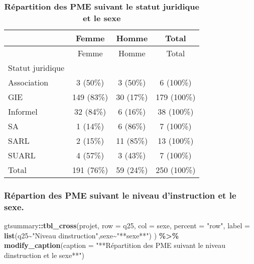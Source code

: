 \documentclass[
]{article}
\newenvironment{Shaded}{\begin{snugshade}}{\end{snugshade}}
\newcommand{\AttributeTok}[1]{\textcolor[rgb]{0.13,0.29,0.53}{#1}}
\newcommand{\FunctionTok}[1]{\textcolor[rgb]{0.13,0.29,0.53}{\textbf{#1}}}
\newcommand{\NormalTok}[1]{#1}
\newcommand{\SpecialCharTok}[1]{\textcolor[rgb]{0.81,0.36,0.00}{\textbf{#1}}}
\newcommand{\StringTok}[1]{\textcolor[rgb]{0.31,0.60,0.02}{#1}}
\begin{document}
\begin{longtable}[]{@{}lccc@{}}
\caption{\textbf{Répartition des PME suivant le statut juridique et le
sexe}}\tabularnewline
\toprule\noalign{}
& Femme & Homme & Total \\
\midrule\noalign{}
\endfirsthead
\toprule\noalign{}
& Femme & Homme & Total \\
\midrule\noalign{}
\endhead
\bottomrule\noalign{}
\endlastfoot
Statut juridique & & & \\
Association & 3 (50\%) & 3 (50\%) & 6 (100\%) \\
GIE & 149 (83\%) & 30 (17\%) & 179 (100\%) \\
Informel & 32 (84\%) & 6 (16\%) & 38 (100\%) \\
SA & 1 (14\%) & 6 (86\%) & 7 (100\%) \\
SARL & 2 (15\%) & 11 (85\%) & 13 (100\%) \\
SUARL & 4 (57\%) & 3 (43\%) & 7 (100\%) \\
Total & 191 (76\%) & 59 (24\%) & 250 (100\%) \\
\end{longtable}

\hypertarget{ruxe9partion-des-pme-suivant-le-niveau-dinstruction-et-le-sexe.}{%
\subsubsection{Répartion des PME suivant le niveau d'instruction et le
sexe.}\label{ruxe9partion-des-pme-suivant-le-niveau-dinstruction-et-le-sexe.}}

\begin{Shaded}
\begin{Highlighting}[]
\NormalTok{gtsummary}\SpecialCharTok{::}\FunctionTok{tbl\_cross}\NormalTok{(projet,}
    \AttributeTok{row =}\NormalTok{  q25,}
    \AttributeTok{col =}\NormalTok{ sexe,}
    \AttributeTok{percent =} \StringTok{"row"}\NormalTok{,}
    \AttributeTok{label =} \FunctionTok{list}\NormalTok{(q25}\SpecialCharTok{\textasciitilde{}}\StringTok{"Niveau d\textquotesingle{}instruction"}\NormalTok{,sexe}\SpecialCharTok{\textasciitilde{}}\StringTok{"**sexe**"}\NormalTok{)}
\NormalTok{  ) }\SpecialCharTok{\%\textgreater{}\%} \FunctionTok{modify\_caption}\NormalTok{(}\AttributeTok{caption =} 
                         \StringTok{"**Répartition des PME suivant}
\StringTok{                       le niveau d\textquotesingle{}instruction et le sexe**"}\NormalTok{) }
\end{Highlighting}
\end{Shaded}
\end{document}
